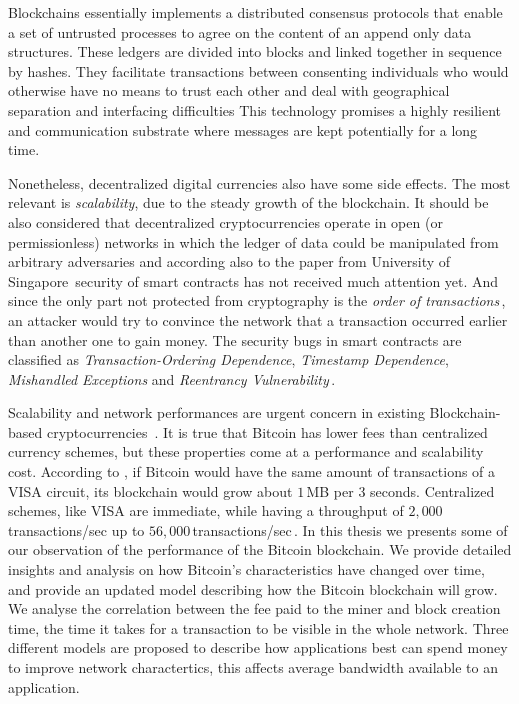 \documentclass[USenglish]{uit-thesis}
\begin{document}
Blockchains essentially implements a distributed consensus protocols that enable a set of untrusted processes to agree on the content of an append only data structures. 
These ledgers are divided into blocks and linked together in sequence by hashes. 
They facilitate transactions between consenting individuals who would otherwise have no means to trust each other and deal with geographical separation and interfacing difficulties 
This technology promises a highly resilient and communication substrate where messages are kept potentially for a long time.

Nonetheless, decentralized digital currencies also have some side effects.
The most relevant is \emph{scalability}, due to the steady growth of the
blockchain. It should be also considered that
decentralized cryptocurrencies operate in open (or permissionless) networks
in which the ledger of data could be manipulated from arbitrary adversaries and
according also to the paper from University of Singapore\,\cite{Luu:2016}
security of smart contracts has not received much attention yet. And since the
only part not protected from cryptography is the \emph{order of transactions}\,\cite{ethereum_white_paper},
an attacker would try to convince the network that a transaction
occurred earlier than another one to gain money.
The security bugs in smart contracts are classified as \emph{Transaction-Ordering Dependence},
\emph{Timestamp Dependence}, \emph{Mishandled Exceptions}
and \emph{Reentrancy Vulnerability}\,\cite{Luu:2016}.


Scalability and network performances are urgent concern in existing Blockchain-based cryptocurrencies~\cite{croman2016}.
It is true that Bitcoin has lower fees than centralized currency schemes, but these properties come at a performance and scalability cost. 
According to \cite{ethereum_white_paper}, if Bitcoin would
have the same amount of transactions of a VISA circuit, its blockchain would grow
about $1$\,MB per 3 seconds.
Centralized schemes, like VISA are immediate, while having a
throughput of $2,000$\,transactions/sec
up to $56,000$\,transactions/sec\,\cite{croman2016}.
In this thesis we presents some of our observation of the performance of the
Bitcoin blockchain.  We provide detailed insights and analysis on how
Bitcoin's characteristics have changed over time, and provide an
updated model describing how the Bitcoin blockchain will grow. 
We analyse the correlation between the fee paid to the miner and block
creation time, the time it takes for a transaction to 
be visible in the whole network.  
Three different models are proposed to describe how applications
best can spend money to improve network charactertics,
this affects average bandwidth available to an application. 
\end{document}
